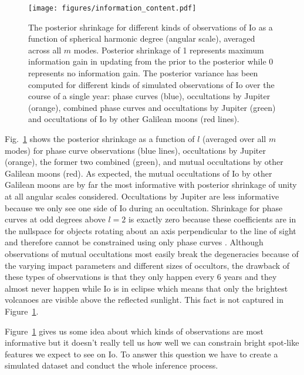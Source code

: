 \documentclass[12pt,dvipsnames]{report}
\begin{document}
\begin{figure}[t!]
    \begin{centering}
    \texttt{[image: figures/information\_content.pdf]}
    \caption{
        The posterior shrinkage for different kinds of observations of Io as a function of spherical harmonic degree (angular scale), averaged across all $m$ modes.
    Posterior shrinkage of 1 represents maximum information gain in updating from the prior to the posterior while 0 represents no information gain. 
    The posterior variance has been computed for different kinds of simulated observations of Io over the course of a single year: phase curves (blue), occultations by Jupiter (orange), combined phase curves and occultations by Jupiter (green) and occultations of Io by other Galilean moons (red lines). 
    }
        \label{fig:information_content}
    \end{centering}
\end{figure}

Fig.~\ref{fig:information_content} shows the posterior shrinkage as a function of $l$ (averaged over all $m$ modes) for phase curve observations (blue lines), occultations by Jupiter (orange), the former two combined (green), and mutual occultations by other Galilean moons (red).
As expected, the mutual occultations of Io by other Galilean moons are by far the most informative with posterior shrinkage of unity at all angular scales considered. 
Occultations by Jupiter are less informative because we only see one side of Io during an occultation.
Shrinkage for phase curves at odd degrees above $l=2$ is exactly zero because these 
coefficients are in the nullspace for objects rotating about an axis perpendicular to 
the line of sight and therefore cannot be constrained using only phase curves 
\citep{2021AJ....162..123L}. 
Although observations of mutual occultations most easily break the degeneracies because 
of the varying impact parameters and different sizes of occultors, the drawback of 
these types of observations is that they only happen every 6 years and they almost never 
happen while Io is in eclipse which means that only the brightest volcanoes are visible 
above the reflected sunlight.
This fact is not captured in Figure~\ref{fig:information_content}. 

Figure~\ref{fig:information_content} gives us some idea about which kinds of observations are most informative but it doesn't really tell us how well we can constrain bright spot-like features we expect to see on Io.
To answer this question we have to create a simulated dataset and conduct the whole inference process.
\end{document}
